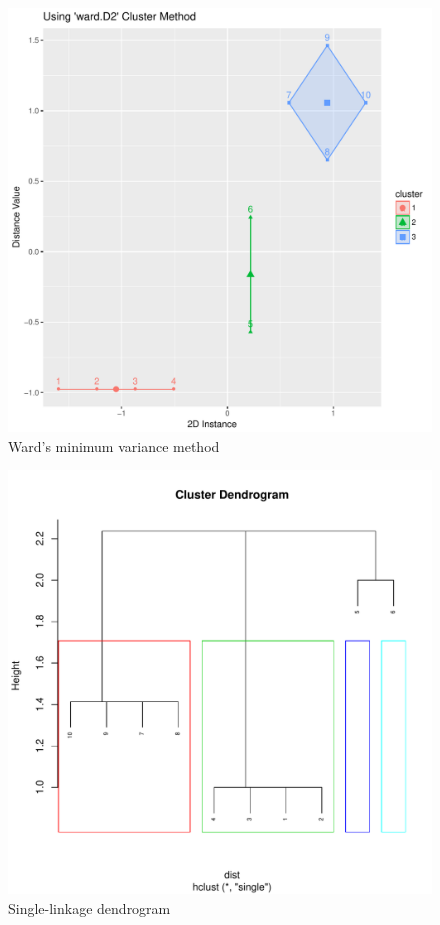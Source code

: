 \documentclass[letterpaper,11pt]{article}
\begin{document}
\begin{figure}[h]
\centering
\includegraphics[scale=0.45]{ward.D2.pdf}
\caption{Ward's minimum variance method}
\label{fig:5}
\end{figure}

\begin{figure}[h]
\centering
\includegraphics[scale=0.5]{single-dendro.pdf}
\caption{Single-linkage dendrogram}
\label{fig:6}
\end{figure}
\end{document}
